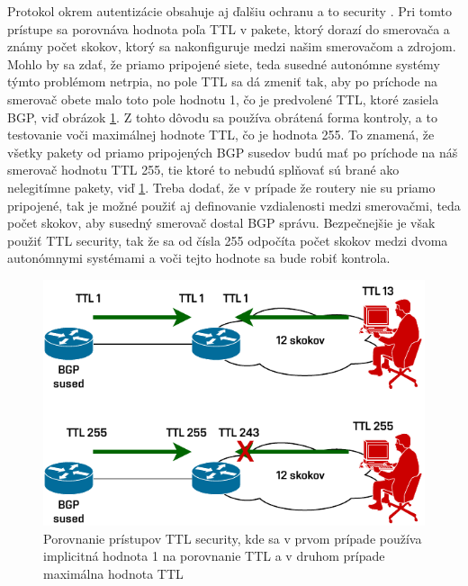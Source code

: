 Protokol  okrem autentizácie obsahuje aj ďalšiu ochranu a to  security \cite{AlHFaPbj6IbKzbuv}. Pri tomto prístupe sa porovnáva hodnota poľa TTL v pakete, ktorý dorazí do smerovača a známy počet skokov, ktorý sa nakonfiguruje medzi našim smerovačom a zdrojom. Mohlo by sa zdať, že priamo pripojené siete, teda susedné autonómne systémy týmto problémom netrpia, no pole TTL sa dá zmeniť tak, aby po príchode na smerovač obete malo toto pole hodnotu 1, čo je predvolené TTL, ktoré zasiela BGP, viď obrázok \ref{fig:ttl-sec}. Z tohto dôvodu sa používa obrátená forma kontroly, a to testovanie voči maximálnej hodnote TTL, čo je hodnota 255. To znamená, že všetky pakety od priamo pripojených BGP susedov budú mať po príchode na náš smerovač hodnotu TTL 255, tie ktoré to nebudú splňovať sú brané ako nelegitímne pakety, viď \ref{fig:ttl-sec}. Treba dodať, že v prípade že routery nie su priamo pripojené, tak je možné použiť aj definovanie vzdialenosti medzi smerovačmi, teda počet skokov, aby susedný smerovač dostal BGP správu. Bezpečnejšie je však použiť TTL security, tak že sa od čísla 255 odpočíta počet skokov medzi dvoma autonómnymi systémami a voči tejto hodnote sa bude robiť kontrola.

\begin{figure}[H]
	\begin{center}
		\includegraphics[scale=1]{obrazky/ttl-sec.pdf}
	\end{center}
	\caption[Porovnanie prístupov TTL security]{Porovnanie prístupov TTL security, kde sa v prvom prípade používa implicitná hodnota 1 na porovnanie TTL a v druhom prípade maximálna hodnota TTL \cite{AlHFaPbj6IbKzbuv}}
	\label{fig:ttl-sec}
\end{figure} 


